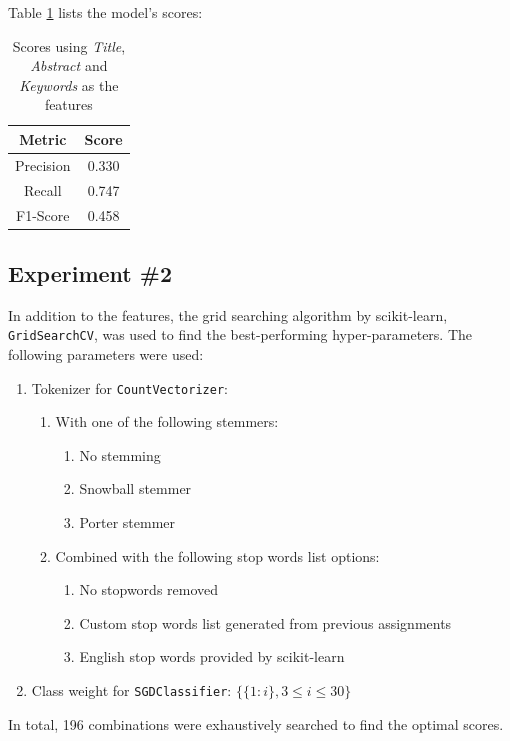 \documentclass[11pt]{article}
\begin{document}
Table \ref{table:gs0_score} lists the model's scores:
\begin{table}[!ht]
    \caption{Scores using \textit{Title}, \textit{Abstract} and \textit{Keywords} as the features}
    \label{table:gs0_score}
    \begin{center}

        \begin{tabular}{| c | c |}
        \hline
        \textbf{Metric} & \textbf{Score}
        \\ \hline
        Precision & 0.330 
        \\ \hline
        Recall & 0.747
        \\ \hline
        F1-Score & 0.458
        \\ \hline
        \end{tabular}

    \end{center}

\end{table}

\subsection*{Experiment \#2}
In addition to the features, the grid searching algorithm by scikit-learn, \texttt{GridSearchCV}, was used to find the best-performing hyper-parameters. The following parameters were used:
\begin{enumerate}
    \item Tokenizer for \texttt{CountVectorizer}:
    \begin{enumerate}
        \item With one of the following stemmers:
        \begin{enumerate}
            \item No stemming
            \item Snowball stemmer
            \item Porter stemmer
        \end{enumerate}
        \item Combined with the following stop words list options:
        \begin{enumerate}
            \item No stopwords removed
            \item Custom stop words list generated from previous assignments
            \item English stop words provided by scikit-learn
        \end{enumerate}
    \end{enumerate}
    \item Class weight for \texttt{SGDClassifier}: $\{\{1: i\}, 3 \le i \le 30\}$
\end{enumerate}
In total, 196 combinations were exhaustively searched to find the optimal scores.
\end{document}
